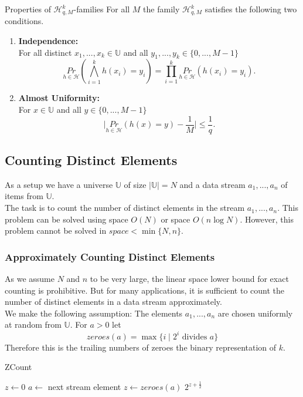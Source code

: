 \documentclass{panikzettel}
\begin{document}
\begin{theo}{Properties of $\mathcal{H}_{q,M}^k$-families}
For all $M$ the family $\mathcal{H}_{q,M}^k$ satisfies the following two conditions.
\begin{enumerate}
\item \textbf{Independence:}\\
For all distinct $x_1,...,x_k\in\mathbb{U}$ and all $y_1,...,y_k\in\{0,...,M-1 \}$
\[
\underset{h\in\mathcal{H}}{Pr}\left( \bigwedge_{i=1}^k h(x_i)=y_i \right) = \prod_{i=1}^k \underset{h\in\mathcal{H}}{Pr}(h(x_i)=y_i).
\]
\item \textbf{Almost Uniformity:}\\ For $x\in\mathbb{U}$ and all $y\in\{0,...,M-1 \}$
\[
\bigg|\underset{h\in\mathcal{H}}{Pr} (h(x)=y)-\frac{1}{M}\bigg|\leq \frac{1}{q}.
\]
\end{enumerate}
\end{theo}



\subsection{Counting Distinct Elements}
As a setup we have a universe $\mathbb{U}$ of size $|\mathbb{U}|=N$ and a data stream $a_1,...,a_n$ of items from $\mathbb{U}$.\\
The task is to count the number of distinct elements in the stream $a_1,...,a_n$. This problem can be solved using space $O(N)$ or space $O(n\log N)$. However, this problem cannot be solved in $space < \min\{N,n \}.$

\subsubsection{Approximately Counting Distinct Elements}
As we assume $N$ and $n$ to be very large, the linear space lower bound for exact counting is prohibitive. But for many applications, it is sufficient to count the number of distinct elements in a data stream approximately.\\
We make the following assumption:
The elements $a_1,...,a_n$ are chosen uniformly at random from $\mathbb{U}$. For $a>0$ let
\[
zeroes(a)=\max \{i \mid 2^i \text{ divides } a \}
\]
Therefore this is the trailing numbers of zeroes the binary representation of $k$.

\begin{algo}{ZCount}
{
\renewcommand{\algorithmicrequire}{\textbf{Input:}}
\renewcommand{\algorithmicensure}{\textbf{Output:}}
  \begin{algorithmic}[1]
  \State $z\leftarrow 0$
  	\State $a\leftarrow$ next stream element
    \State $z\leftarrow zeroes(a)$
    \EndIf
  \EndWhile
  \State \Return $2^{z+\frac{1}{2}}$ 
  \end{algorithmic}
}
\end{algo}
\end{document}

